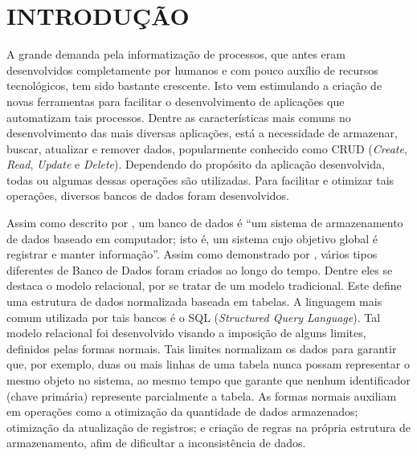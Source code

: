 \chapter{INTRODUÇÃO}
\label{Introducao}

A grande demanda pela informatização de processos, que antes eram desenvolvidos completamente por humanos e com pouco auxílio de recursos tecnológicos, tem sido bastante crescente. Isto vem estimulando a criação de novas ferramentas para facilitar o desenvolvimento de aplicações que automatizam tais processos. Dentre as características mais comuns no desenvolvimento das mais diversas aplicações, está a necessidade de armazenar, buscar, atualizar e remover dados, popularmente conhecido como CRUD (\textit{Create}, \textit{Read}, \textit{Update} e \textit{Delete}). Dependendo do propósito da aplicação desenvolvida, todas ou algumas dessas operações são utilizadas. Para facilitar e otimizar tais operações, diversos bancos de dados foram desenvolvidos.


Assim como descrito por , um banco de dados é ``um sistema de armazenamento de dados baseado em computador; isto é, um sistema cujo objetivo global é registrar e manter informação''. Assim como demonstrado por , vários tipos diferentes de Banco de Dados foram criados ao longo do tempo. Dentre eles se destaca o modelo relacional, por se tratar de um modelo tradicional. Este define uma estrutura de dados normalizada baseada em tabelas. A linguagem mais comum  utilizada por tais bancos é o SQL (\textit{Structured Query Language}). Tal modelo relacional foi desenvolvido visando a imposição de alguns limites, definidos pelas formas normais. Tais limites normalizam os dados para garantir que, por exemplo, duas ou mais linhas de uma tabela nunca possam representar o mesmo objeto no sistema, ao mesmo tempo que garante que nenhum identificador (chave primária) represente parcialmente a tabela. As formas normais auxiliam em operações como a otimização da quantidade de dados armazenados; otimização da atualização de registros; e criação de regras na própria estrutura de armazenamento, afim de dificultar a inconsistência de dados.

